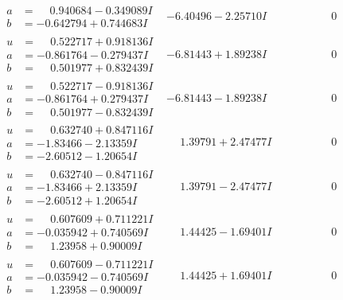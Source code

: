 \documentclass[1p]{elsarticle_modified}
\theoremstyle{definition}
\begin{document}
$$\begin{array}{c|c|c}
\begin{aligned}
a &= \phantom{-}0.940684 - 0.349089 I \\
b &= -0.642794 + 0.744683 I\end{aligned}
 & -6.40496 - 2.25710 I & \phantom{-0.000000 } 0 \\ \hline\begin{aligned}
u &= \phantom{-}0.522717 + 0.918136 I \\
a &= -0.861764 - 0.279437 I \\
b &= \phantom{-}0.501977 + 0.832439 I\end{aligned}
 & -6.81443 + 1.89238 I & \phantom{-0.000000 } 0 \\ \hline\begin{aligned}
u &= \phantom{-}0.522717 - 0.918136 I \\
a &= -0.861764 + 0.279437 I \\
b &= \phantom{-}0.501977 - 0.832439 I\end{aligned}
 & -6.81443 - 1.89238 I & \phantom{-0.000000 } 0 \\ \hline\begin{aligned}
u &= \phantom{-}0.632740 + 0.847116 I \\
a &= -1.83466 - 2.13359 I \\
b &= -2.60512 - 1.20654 I\end{aligned}
 & \phantom{-}1.39791 + 2.47477 I & \phantom{-0.000000 } 0 \\ \hline\begin{aligned}
u &= \phantom{-}0.632740 - 0.847116 I \\
a &= -1.83466 + 2.13359 I \\
b &= -2.60512 + 1.20654 I\end{aligned}
 & \phantom{-}1.39791 - 2.47477 I & \phantom{-0.000000 } 0 \\ \hline\begin{aligned}
u &= \phantom{-}0.607609 + 0.711221 I \\
a &= -0.035942 + 0.740569 I \\
b &= \phantom{-}1.23958 + 0.90009 I\end{aligned}
 & \phantom{-}1.44425 - 1.69401 I & \phantom{-0.000000 } 0 \\ \hline\begin{aligned}
u &= \phantom{-}0.607609 - 0.711221 I \\
a &= -0.035942 - 0.740569 I \\
b &= \phantom{-}1.23958 - 0.90009 I\end{aligned}
 & \phantom{-}1.44425 + 1.69401 I & \phantom{-0.000000 } 0 \\ \hline\begin{aligned}

\end{aligned}
\end{array}$$
\end{document}
